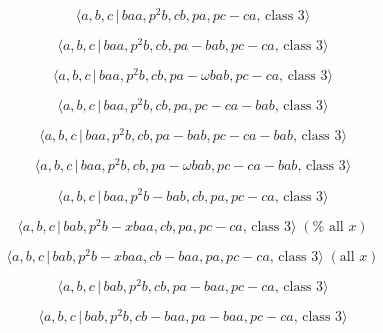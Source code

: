 \documentclass[10pt]{article}
\begin{document}
\begin{equation}
\langle a,b,c\,|\,baa,p^2b,cb,pa,pc-ca,\,\text{class }3\rangle  \tag{7.2865}
\end{equation}

\begin{equation}
\langle a,b,c\,|\,baa,p^2b,cb,pa-bab,pc-ca,\,\text{class }3\rangle 
\tag{7.2866}
\end{equation}

\begin{equation}
\langle a,b,c\,|\,baa,p^{2}b,cb,pa-\omega bab,pc-ca,\,\text{class }3\rangle 
\tag{7.2867}
\end{equation}

\begin{equation}
\langle a,b,c\,|\,baa,p^2b,cb,pa,pc-ca-bab,\,\text{class }3\rangle 
\tag{7.2868}
\end{equation}

\begin{equation}
\langle a,b,c\,|\,baa,p^2b,cb,pa-bab,pc-ca-bab,\,\text{class }3\rangle 
\tag{7.2869}
\end{equation}

\begin{equation}
\langle a,b,c\,|\,baa,p^{2}b,cb,pa-\omega bab,pc-ca-bab,\,\text{class }%
3\rangle  \tag{7.2870}
\end{equation}

\begin{equation}
\langle a,b,c\,|\,baa,p^2b-bab,cb,pa,pc-ca,\,\text{class }3\rangle 
\tag{7.2871}
\end{equation}

\begin{equation}
\langle a,b,c\,|\,bab,p^2b-xbaa,cb,pa,pc-ca,\,\text{class }3\rangle \;(\text{%
all }x)  \tag{7.2872}
\end{equation}

\begin{equation}
\langle a,b,c\,|\,bab,p^2b-xbaa,cb-baa,pa,pc-ca,\,\text{class }3\rangle \;(%
\text{all }x)  \tag{7.2873}
\end{equation}

\begin{equation}
\langle a,b,c\,|\,bab,p^2b,cb,pa-baa,pc-ca,\,\text{class }3\rangle 
\tag{7.2874}
\end{equation}

\begin{equation}
\langle a,b,c\,|\,bab,p^2b,cb-baa,pa-baa,pc-ca,\,\text{class }3\rangle 
\tag{7.2875}
\end{equation}
\end{document}
